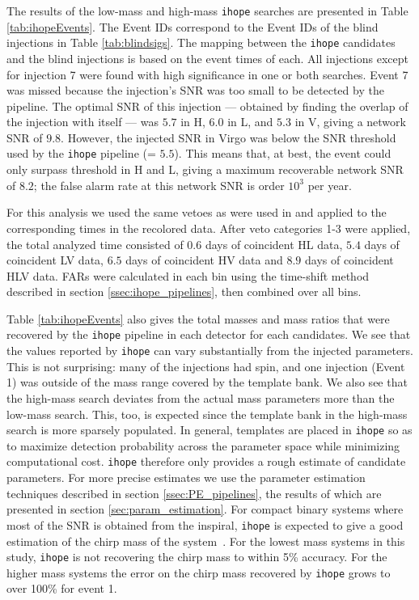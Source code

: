 \documentclass[12pt]{iopart}
\newcommand{\ihope}{\texttt{ihope}}
\begin{document}
The results of the low-mass and high-mass \ihope{} searches are presented in
Table \ref{tab:ihopeEvents}. The Event IDs correspond to the Event IDs of the
blind injections in Table \ref{tab:blindsigs}. The mapping between the \ihope{}
candidates and the blind injections is based on the event times of each. All
injections except for injection 7 were found with high significance in one or
both searches. Event 7 was missed because the injection's SNR was too small to
be detected by the pipeline. The optimal SNR of this injection --- obtained
by finding the overlap of the injection with itself --- was $5.7$ in H, $6.0$ in 
L,
and $5.3$ in V, giving a network SNR of $9.8$. However, the injected SNR in 
Virgo was
below the SNR threshold used by the \ihope{} pipeline (= $5.5$). This
means that, at best, the event could only surpass threshold in H and L, giving
a maximum recoverable network SNR of $8.2$; the false alarm rate at this
network SNR is order $10^3$ per year.

For this analysis we used the same vetoes as were used in
\cite{Colaboration:2011np} and \cite{Aasi:2012rja} applied to
the corresponding times in the recolored data. After veto categories
1-3 were applied, the total analyzed time consisted of $0.6$ days of
coincident HL data, $5.4$ days of coincident LV data, $6.5$ days of
coincident HV data and $8.9$ days of coincident HLV data.  FARs were
calculated in each bin using the time-shift method described in
section \ref{ssec:ihope_pipelines}, then combined over all bins.

Table \ref{tab:ihopeEvents} also gives the total masses and mass ratios that 
were recovered by the \ihope{} pipeline in each detector for each candidates. 
We see that the values reported by \ihope{} can vary substantially
from the injected parameters. This is not surprising: many of the injections
had spin, and one injection (Event 1) was outside of the mass range covered by 
the template bank.
We also see that the high-mass search deviates from the actual mass parameters
more than the low-mass search. This, too, is expected since the template bank in
the high-mass search is more sparsely populated. In general, templates are
placed in \ihope{} so as to maximize detection probability across the parameter
space while minimizing computational cost. \ihope{} therefore only provides a
rough estimate of candidate parameters. For more precise estimates we use the
parameter estimation techniques described in section \ref{ssec:PE_pipelines}, 
the
results of which are presented in section \ref{sec:param_estimation}. For 
compact binary systems where most of the SNR is obtained from the inspiral, 
\ihope{} is expected to give a good estimation of the chirp mass of the 
system~\cite{Cutler:1994ys,Poisson:1995ef,Hannam:2013uu}. For the lowest mass 
systems in this study, \ihope{} is not recovering the chirp mass to within 5\% 
accuracy. For the higher mass systems the error on the chirp mass recovered by 
\ihope{} grows to over 100\% for event 1.
\end{document}
